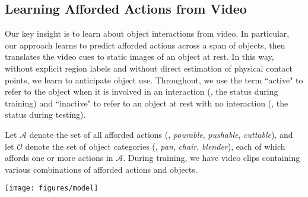 \documentclass[10pt,twocolumn,letterpaper]{article}
\begin{document}
\subsection{Learning Afforded Actions from Video} \label{sec:action_clf}

Our key insight is to learn about object interactions from video.  In particular, our approach learns to predict afforded actions across a span of objects, then translates the video cues to static images of an object at rest.
In this way, without explicit region labels and without direct estimation of physical contact points, we learn to anticipate object use.
Throughout, we use the term ``active" to refer to the object when it is involved in an interaction (\ie, the status during training) and ``inactive" to refer to an object at rest with no interaction (\ie, the status during testing).


Let $\mathcal{A}$ denote the set of all afforded actions (\eg, \emph{pourable}, \emph{pushable}, \emph{cuttable}), and let $\mathcal{O}$ denote the set of object categories (\eg, \emph{pan}, \emph{chair}, \emph{blender}), each of which affords one or more actions in $\mathcal{A}$. During training, we have video clips containing various combinations of afforded actions and objects.  




\begin{figure*}[htb!]
\centering
\texttt{[image: figures/model]}
\caption{\textbf{Illustration of our framework for training (left) and testing (right)}. \textbf{Left panel}: The two components of our model ---the video action classifier (Sec.~\ref{sec:action_clf}) and the anticipation module with its associated losses (Sec.~\ref{sec:distill} and~\ref{sec:hotspot_modifications})---are jointly trained to predict the action class in a video clip while building an affordance-aware internal representation for objects. \textbf{Right panel}: Once trained, our model generates ``interaction hotspot" maps for a novel \emph{inactive} object image (top left fridge image).  It first hallucinates features that would occur for the object \emph{if it were active} (top right photo), then derives gradient-weighted attention maps over the original image, for each action. Our method can infer hotspots even for novel object categories unseen in the training video; for example, learning about opening microwaves helps anticipate how to open the fridge. Note that $x_I$, $\widetilde{x}_I$ are in feature space, not pixel space.
}
\label{fig:model}
\end{figure*}
\end{document}
